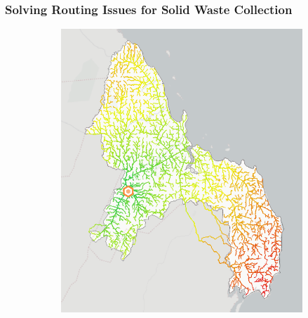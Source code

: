 \documentclass[a4paper,12pt,twoside]{article}
\begin{document}
\newpage
\subsubsection{Solving Routing Issues for Solid Waste Collection}

\begin{figure}[h]
\centering
  \begin{subfigure}[b]{0.34\textwidth}
    \includegraphics[width=\textwidth]{images/pgRouting.png}
    \label{fig:1}
  \end{subfigure} \hspace{20mm} %
  \begin{subfigure}[b]{0.37\textwidth}

\end{subfigure}
\end{figure}
\end{document}
